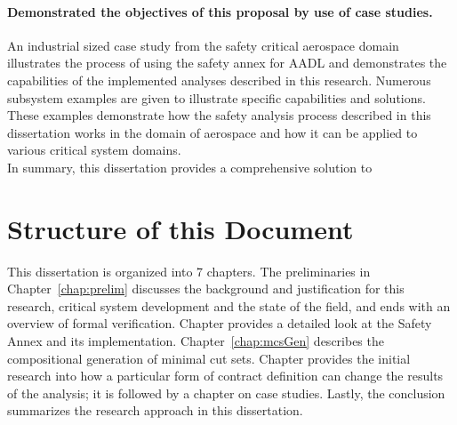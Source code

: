 \paragraph{Demonstrated the objectives of this proposal by use of case studies.}
An industrial sized case study from the safety critical aerospace domain illustrates the process of using the safety annex for AADL and demonstrates the capabilities of the implemented analyses described in this research. Numerous subsystem examples are given to illustrate specific capabilities and solutions. These examples demonstrate how the safety analysis process described in this dissertation works in the domain of aerospace and how it can be applied to various critical system domains. \\

In summary, this dissertation provides a comprehensive solution to 

\section{Structure of this Document}
This dissertation is organized into 7 chapters. The preliminaries in Chapter~\ref{chap:prelim} discusses the background and justification for this research, critical system development and the state of the field, and ends with an overview of formal verification. Chapter \label{chap:faultModeling} provides a detailed look at the Safety Annex and its implementation. Chapter~\ref{chap:mcsGen} describes the compositional generation of minimal cut sets. Chapter \label{chap:granularity} provides the initial research into how a particular form of contract definition can change the results of the analysis; it is followed by a chapter on case studies. Lastly, the conclusion summarizes the research approach in this dissertation.











